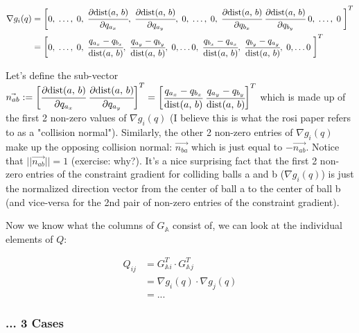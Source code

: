 \documentclass[12pt]{article}
\newcommand{\GA}{G_{\mathbb{A}}}
\newcommand{\pd}[2]{\cfrac{\partial{#1}}{\partial{#2}}}
\newcommand{\dist}[2]{\text{dist(} #1 \text{, } #2 \text{)}}
\begin{document}
\begin{align*}
    \nabla g_i(q)
        &= \begin{bmatrix}
            0, \; \dots, \; 0, \;
            \pd{\dist{a}{b}}{q_{a_x}}, \; \pd{\dist{a}{b}}{q_{a_y}}, \;
            0, \; \dots, \; 0, \;
            \pd{\dist{a}{b}}{q_{b_x}} \; \pd{\dist{a}{b}}{q_{b_y}} \;
            0, \; \dots, \; 0 \;
        \end{bmatrix}^T \\
        &= \begin{bmatrix}
            0, \; \dots, \; 0, \;
            \cfrac{q_{a_x} - q_{b_x}}{\dist{a}{b}}, \; \cfrac{q_{a_y} - q_{b_y}}{\dist{a}{b}}, \;
            0, \dots 0, \;
            \cfrac{q_{b_x} - q_{a_x}}{\dist{a}{b}}, \; \cfrac{q_{b_y} - q_{a_y}}{\dist{a}{b}}, \;
            0, \dots 0 \;
        \end{bmatrix}^T
\end{align*}

Let's define the sub-vector
$\vec{n_{ab}}
    := \begin{bmatrix}
        \pd{\dist{a}{b}}{q_{a_x}} \; \pd{\dist{a}{b}}{q_{a_y}}
    \end{bmatrix}^T
    = \begin{bmatrix}
        \cfrac{q_{a_x} - q_{b_x}}{\dist{a}{b}} \; \cfrac{q_{a_y} - q_{b_y}}{\dist{a}{b}}
    \end{bmatrix}^T$
which is made up of the first 2 non-zero values of $\nabla g_i(q)$ (I believe this is what the rosi paper refers to as a "collision normal").
Similarly, the other 2 non-zero entries of $\nabla g_i(q)$ make up the opposing 
collision normal: $\vec{n_{ba}}$ which is just equal to $-\vec{n_{ab}}$.
Notice that $||\vec{n_{ab}}|| = 1$ (exercise: why?).
It's a nice surprising fact that the first 2 non-zero entries of the constraint gradient for colliding balls a and b ($\nabla g_i(q)$)
is just the normalized direction vector from the center of ball a to the center of ball b
(and vice-versa for the 2nd pair of non-zero entries of the constraint gradient).

Now we know what the columns of $\GA$ consist of, we can look at the individual elements of $Q$:

\begin{align*}
Q_{ij}
    &= \GA^T{_i} \cdot \GA^T{_j}\\
    &= \nabla g_i(q) \cdot \nabla g_j(q)\\
    &= ...
\end{align*}

\subsubsection*{... 3 Cases} 
\end{document}
